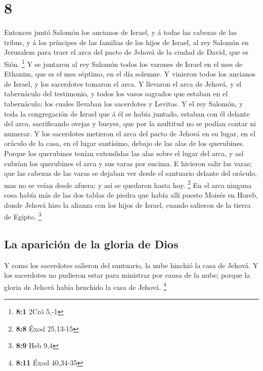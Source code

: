 \hypertarget{section-7}{%
\section{8}\label{section-7}}

 Entonces juntó Salomón los ancianos de Israel, y á todas
las cabezas de las tribus, y á los príncipes de las familias de los
hijos de Israel, al rey Salomón en Jerusalem para traer el arca del
pacto de Jehová de la ciudad de David, que es Sión. \footnote{\textbf{8:1}
  2Cró 5,-1}  Y se juntaron al rey Salomón todos los
varones de Israel en el mes de Ethanim, que es el mes séptimo, en el día
solemne.  Y vinieron todos los ancianos de Israel, y los
sacerdotes tomaron el arca.  Y llevaron el arca de Jehová,
y el tabernáculo del testimonio, y todos los vasos sagrados que estaban
en el tabernáculo; los cuales llevaban los sacerdotes y Levitas.
 Y el rey Salomón, y toda la congregación de Israel que á
él se había juntado, estaban con él delante del arca, sacrificando
ovejas y bueyes, que por la multitud no se podían contar ni numerar.
 Y los sacerdotes metieron el arca del pacto de Jehová en
su lugar, en el oráculo de la casa, en el lugar santísimo, debajo de las
alas de los querubines.  Porque los querubines tenían
extendidas las alas sobre el lugar del arca, y así cubrían los
querubines el arca y sus varas por encima.  E hicieron
salir las varas; que las cabezas de las varas se dejaban ver desde el
santuario delante del oráculo, mas no se veían desde afuera: y así se
quedaron hasta hoy. \footnote{\textbf{8:8} Éxod 25,13-15} 
En el arca ninguna cosa había más de las dos tablas de piedra que había
allí puesto Moisés en Horeb, donde Jehová hizo la alianza con los hijos
de Israel, cuando salieron de la tierra de Egipto. \footnote{\textbf{8:9}
  Heb 9,4}

\hypertarget{la-apariciuxf3n-de-la-gloria-de-dios}{%
\subsection{La aparición de la gloria de
Dios}\label{la-apariciuxf3n-de-la-gloria-de-dios}}

 Y como los sacerdotes salieron del santuario, la nube
hinchió la casa de Jehová.  Y los sacerdotes no pudieron
estar para ministrar por causa de la nube; porque la gloria de Jehová
había henchido la casa de Jehová. \footnote{\textbf{8:11} Éxod 40,34-35}

